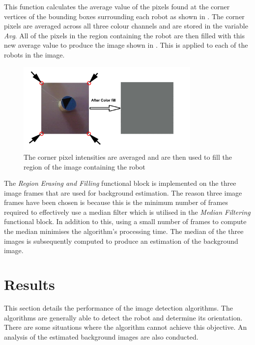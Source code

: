 \documentclass{article}
\begin{document}


This function calculates the average value of the pixels found at the corner vertices of the bounding boxes surrounding each robot as shown in . The corner pixels are averaged across all three colour channels and are stored in the variable \textit{Avg}. All of the pixels in the region containing the robot are then filled with this new average value to produce the image shown in . This is applied to each of the robots in the image. \\

\begin{figure}[h!]
	\centering
		\includegraphics[width=0.8\textwidth]{../Drawings/backgroundErasingMain.pdf}
	\caption{The corner pixel intensities are averaged and are then used to fill the region of the image containing the robot}
	\label{fig:vertices}
\end{figure}

The \textit{Region Erasing and Filling} functional block is implemented on the three image frames that are used for background estimation. The reason three image frames have been chosen is because this is the minimum number of frames required to effectively use a median filter which is utilised in the \textit{Median Filtering} functional block. In addition to this, using a small number of frames to compute the median minimises the algorithm's processing time. The median of the three images is subsequently computed to produce an estimation of the background image.

\section{Results}
\label{sec:results}
This section details the performance of the image detection algorithms. The algorithms are generally able to detect the robot and determine its orientation. There are some situations where the algorithm cannot achieve this objective. An analysis of the estimated background images are also conducted.
 
\end{document}

